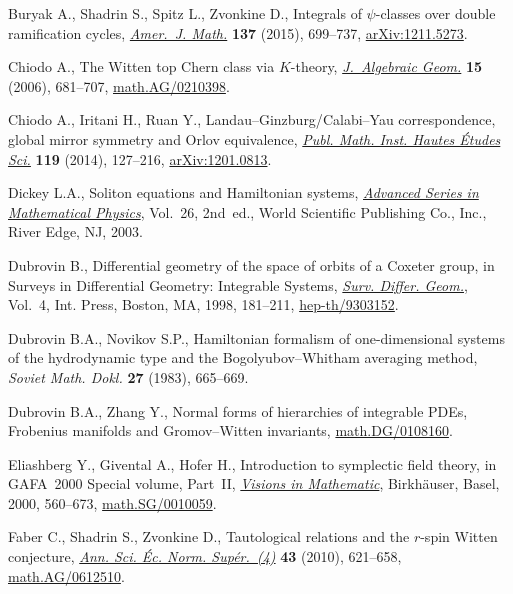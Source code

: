 \documentclass[pdftex]{sigma}
\numberwithin{equation}{section}
\newcommand{\<}{\left<}
\renewcommand{\>}{\right>}
\begin{document}
\begin{thebibliography}{99}
Buryak A., Shadrin S., Spitz L., Zvonkine D., Integrals of {$\psi$}-classes
 over double ramif\/ication cycles, \href{https://doi.org/10.1353/ajm.2015.0022}{\textit{Amer.~J. Math.}} \textbf{137} (2015),
 699--737, \href{https://arxiv.org/abs/1211.5273}{arXiv:1211.5273}.

Chiodo A., The {W}itten top {C}hern class via {$K$}-theory,
 \href{https://doi.org/10.1090/S1056-3911-06-00444-9}{\textit{J.~Algebraic Geom.}} \textbf{15} (2006), 681--707,
 \href{https://arxiv.org/abs/math.AG/0210398}{math.AG/0210398}.

Chiodo A., Iritani H., Ruan Y., Landau--{G}inzburg/{C}alabi--{Y}au
 correspondence, global mirror symmetry and {O}rlov equivalence, \href{https://doi.org/10.1007/s10240-013-0056-z}{\textit{Publ.
 Math. Inst. Hautes \'Etudes Sci.}} \textbf{119} (2014), 127--216,
 \href{https://arxiv.org/abs/1201.0813}{arXiv:1201.0813}.

Dickey L.A., Soliton equations and {H}amiltonian systems, \href{https://doi.org/10.1142/5108}{\textit{Advanced
 Series in Mathematical Physics}}, Vol.~26, 2nd~ed., World Scientif\/ic
 Publishing Co., Inc., River Edge, NJ, 2003.

Dubrovin B., Dif\/ferential geometry of the space of orbits of a {C}oxeter group,
 in Surveys in Dif\/ferential Geometry: Integrable Systems, \href{https://doi.org/10.4310/SDG.1998.v4.n1.a4}{\textit{Surv.
 Differ. Geom.}}, Vol.~4, Int. Press, Boston, MA, 1998, 181--211,
 \mbox{\href{https://arxiv.org/abs/hep-th/9303152}{hep-th/9303152}}.

Dubrovin B.A., Novikov S.P., Hamiltonian formalism of one-dimensional systems
 of the hydrodynamic type and the {B}ogolyubov--{W}hitham averaging method,
 \textit{Soviet Math. Dokl.} \textbf{27} (1983), 665--669.

Dubrovin B.A., Zhang Y., Normal forms of hierarchies of integrable {PDE}s,
 {F}robenius manifolds and {G}romov--{W}itten invariants,
 \href{https://arxiv.org/abs/math.DG/0108160}{math.DG/0108160}.

Eliashberg Y., Givental A., Hofer H., Introduction to symplectic f\/ield theory,
 in GAFA~2000 Special volume, Part~II, \href{https://doi.org/10.1007/978-3-0346-0425-3_4}{\textit{Visions in Mathematic}}, Birkh\"auser,
 Basel, 2000, 560--673, \href{https://arxiv.org/abs/math.SG/0010059}{math.SG/0010059}.

Faber C., Shadrin S., Zvonkine D., Tautological relations and the {$r$}-spin
 {W}itten conjecture, \href{https://doi.org/10.24033/asens.2130}{\textit{Ann. Sci. \'Ec. Norm. Sup\'er.~(4)}} \textbf{43}
 (2010), 621--658, \href{https://arxiv.org/abs/math.AG/0612510}{math.AG/0612510}.


\end{thebibliography}
\end{document}
